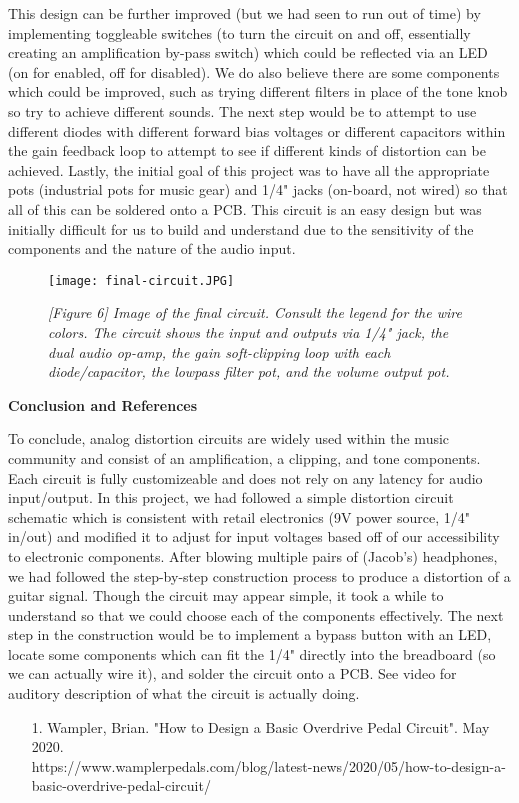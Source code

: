 \documentclass[11pt]{article}
\begin{document}
This design can be further improved (but we had seen to run out of time) by implementing toggleable switches (to turn the circuit on and off, essentially creating an amplification by-pass switch) which could be reflected via an LED (on for enabled, off for disabled). We do also believe there are some components which could be improved, such as trying different filters in place of the tone knob so try to achieve different sounds. The next step would be to attempt to use different diodes with different forward bias voltages or different capacitors within the gain feedback loop to attempt to see if different kinds of distortion can be achieved. Lastly, the initial goal of this project was to have all the appropriate pots (industrial pots for music gear) and 1/4" jacks (on-board, not wired) so that all of this can be soldered onto a PCB. This circuit is an easy design but was initially difficult for us to build and understand due to the sensitivity of the components and the nature of the audio input. 


\begin{figure}[H]
    \centering
    \texttt{[image: final-circuit.JPG]}
    \caption*{\textit{[Figure 6] Image of the final circuit. Consult the legend for the wire colors. The circuit shows the input and outputs via 1/4" jack, the dual audio op-amp, the gain soft-clipping loop with each diode/capacitor, the lowpass filter pot, and the volume output pot.}}
\end{figure}


\vspace{10pt}

 \selectfont 

\nd \textbf{Conclusion and References}

\vspace{5pt}

\selectfont To conclude, analog distortion circuits are widely used within the music community and consist of an amplification, a clipping, and tone components. Each circuit is fully customizeable and does not rely on any latency for audio input/output. In this project, we had followed a simple distortion circuit schematic which is consistent with retail electronics (9V power source, 1/4" in/out) and modified it to adjust for input voltages based off of our accessibility to electronic components. After blowing multiple pairs of (Jacob's) headphones, we had followed the step-by-step construction process to produce a distortion of a guitar signal. Though the circuit may appear simple, it took a while to understand so that we could choose each of the components effectively. The next step in the construction would be to implement a bypass button with an LED, locate some components which can fit the 1/4" directly into the breadboard (so we can actually wire it), and solder the circuit onto a PCB. See video for auditory description of what the circuit is actually doing.



\vspace{10pt}


\begin{enumerate}
    \item[1.] Wampler, Brian. "How to Design a Basic Overdrive Pedal Circuit". May 2020. \\ 
    \color{blue} https://www.wamplerpedals.com/blog/latest-news/2020/05/how-to-design-a-basic-overdrive-pedal-circuit/ \color{black}    
\end{enumerate}
\end{document}
